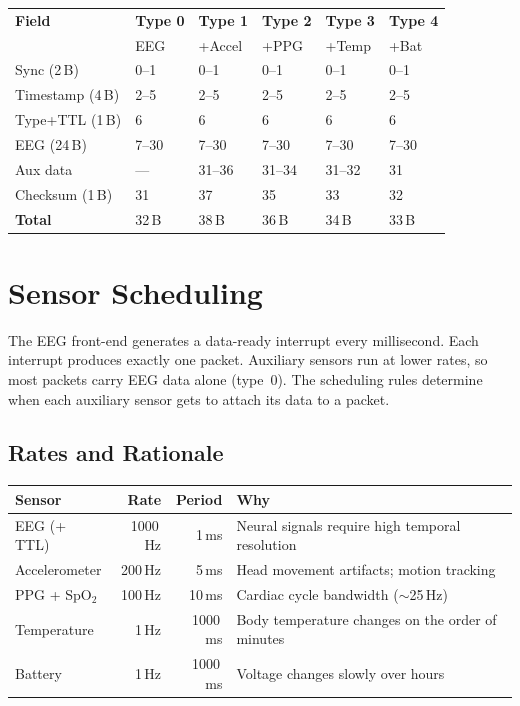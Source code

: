\documentclass[11pt,a4paper]{article}
\begin{document}
\medskip
\begin{tabular}{lC{1.4cm}C{1.4cm}C{1.4cm}C{1.4cm}C{1.4cm}}
\toprule
\textbf{Field} & \textbf{Type 0} & \textbf{Type 1} & \textbf{Type 2} & \textbf{Type 3} & \textbf{Type 4} \\
& \scriptsize EEG & \scriptsize +Accel & \scriptsize +PPG & \scriptsize +Temp & \scriptsize +Bat \\
\midrule
Sync (2\,B)      & 0--1   & 0--1   & 0--1   & 0--1   & 0--1   \\
Timestamp (4\,B) & 2--5   & 2--5   & 2--5   & 2--5   & 2--5   \\
Type+TTL (1\,B)  & 6      & 6      & 6      & 6      & 6      \\
EEG (24\,B)      & 7--30  & 7--30  & 7--30  & 7--30  & 7--30  \\
Aux data         & ---    & 31--36 & 31--34 & 31--32 & 31     \\
Checksum (1\,B)  & 31     & 37     & 35     & 33     & 32     \\
\midrule
\textbf{Total}   & 32\,B  & 38\,B  & 36\,B  & 34\,B  & 33\,B  \\
\bottomrule
\end{tabular}
\medskip

\section{Sensor Scheduling}
\label{sec:scheduling}

The EEG front-end generates a data-ready interrupt every millisecond.  Each interrupt produces exactly one packet.  Auxiliary sensors run at lower rates, so most packets carry EEG data alone (type~0).  The scheduling rules determine when each auxiliary sensor gets to attach its data to a packet.

\subsection{Rates and Rationale}

\medskip
\begin{tabular}{lrrl}
\toprule
\textbf{Sensor} & \textbf{Rate} & \textbf{Period} & \textbf{Why} \\
\midrule
EEG (+\,TTL)    & 1000\,Hz & 1\,ms     & Neural signals require high temporal resolution \\
Accelerometer   & 200\,Hz  & 5\,ms     & Head movement artifacts; motion tracking \\
PPG + SpO$_2$   & 100\,Hz  & 10\,ms    & Cardiac cycle bandwidth (${\sim}$25\,Hz) \\
Temperature     & 1\,Hz    & 1000\,ms  & Body temperature changes on the order of minutes \\
Battery         & 1\,Hz    & 1000\,ms  & Voltage changes slowly over hours \\
\bottomrule
\end{tabular}
\medskip
\end{document}
